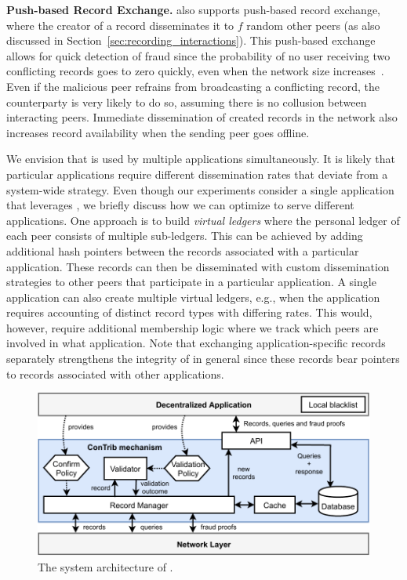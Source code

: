 \textbf{Push-based Record Exchange.}
\TrustChain{} also supports push-based record exchange, where the creator of a record disseminates it to $ f $ random other peers (as also discussed in Section~\ref{sec:recording_interactions}).
This push-based exchange allows for quick detection of fraud since the probability of no user receiving two conflicting records goes to zero quickly, even when the network size increases~\cite{osipkov2007combating}.
Even if the malicious peer refrains from broadcasting a conflicting record, the counterparty is very likely to do so, assuming there is no collusion between interacting peers.
Immediate dissemination of created records in the network also increases record availability when the sending peer goes offline.

We envision that \TrustChain{} is used by multiple applications simultaneously.
It is likely that particular applications require different dissemination rates that deviate from a system-wide strategy.
Even though our experiments consider a single application that leverages \TrustChain{}, we briefly discuss how we can optimize \TrustChain{} to serve different applications.
One approach is to build \emph{virtual ledgers} where the personal ledger of each peer consists of multiple sub-ledgers.
This can be achieved by adding additional hash pointers between the records associated with a particular application.
These records can then be disseminated with custom dissemination strategies to other peers that participate in a particular application.
A single application can also create multiple virtual ledgers, e.g., when the application requires accounting of distinct record types with differing rates.
This would, however, require additional membership logic where we track which peers are involved in what application.
Note that exchanging application-specific records separately strengthens the integrity of \TrustChain{} in general since these records bear pointers to records associated with other applications.

\begin{figure}[t]
	\centering
	\includegraphics[width=\linewidth]{trustchain/assets/system_architecture}
	\caption{The system architecture of \TrustChain{}.}
	\label{fig:system_architecture}
\end{figure}

